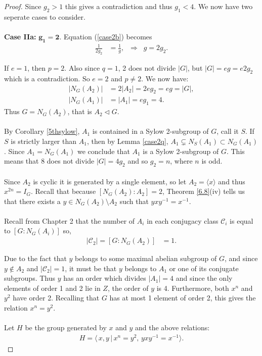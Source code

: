 \documentclass[a4paper , 11pt]{book}
\theoremstyle{definition}
\theoremstyle{remark}
\begin{document}
\begin{proof}
Since $g_2 > 1$  this gives a contradiction and thus $g_1 < 4$. We now have two seperate cases to consider.\\
\\
\textbullet \space \textbf{Case IIa:} $\pmb{g_1 = 2}$. Equation (\ref{case2b}) becomes
\begin{align*} \frac{1}{2g_2} &= \frac{1}{g}, \; \; \Longrightarrow \; \; g = 2g_2.
\end{align*}

If $e=1$, then $p=2$. Also since $q=1$, 2 does not divide $|G|$, but $|G| = eg = e2g_2$ which is a contradiction. So $e=2$ and $p \neq 2$. We now have:
\begin{align*} |N_G(A_2)| &= 2|A_2|  = 2eg_2 = eg = |G|,  \tag{since $s+t = 2$}
\\ |N_G(A_1)| &= |A_1| = eg_1 = 4. \tag{since $s=1$} 
\end{align*}
Thus $G = N_G(A_2)$, that is $A_2 \vartriangleleft G$.\\
\\
By Corollary \ref{5thsylow}, $A_1$ is contained in a Sylow 2-subgroup of $G$, call it $S$. If $S$ is strictly larger than $A_1$, then by Lemma \ref{case2q}, $A_1 \subsetneq N_S(A_1) \subset N_G(A_1)$. Since $A_1 = N_G(A_1)$ we conclude that $A_1$ is a Sylow 2-subgroup of $G$. This means that 8 does not divide $|G| = 4g_2$ and so $g_2 = n$, where $n$ is odd. \\
\\
Since $A_2$ is cyclic it is generated by a single element, so let $A_2 = \langle x \rangle$ and thus $x^{2n}= I_G$.  Recall that because $[N_G(A_2): A_2] = 2$, Theorem \ref{6.8}(iv) tells us that there exists a $y \in N_G(A_2) \! \setminus \! A_2$ such that $yxy^{-1} = x^{-1}$. \\
\\
Recall from Chapter 2 that the number of $A_i$ in each conjugacy class $\mathcal{C}_i$ is equal to $[G : N_G(A_i)]$ so,
\begin{align*}  |\mathcal{C}_2| = [G:N_G(A_2)] &= 1.
\end{align*}

Due to the fact that $y$ belongs to some maximal abelian subgroup of $G$, and since $y \not \in A_2$ and $|\mathcal{C}_2| = 1$, it must be that $y$ belongs to $A_1$ or one of its conjugate subgroups. Thus $y$ has an order which divides $|A_1| = 4$ and since the only elements of order 1 and 2 lie in $Z$, the order of $y$ is 4. Furthermore, both $x^n$ and $y^2$ have order 2. Recalling that $G$ has at most 1 element of order 2, this gives the relation $x^n = y^2$. \\ 
\\
Let $H$ be the group generated by $x$ and $y$ and the above relations:
\begin{align*} H = \langle \, x,y \, | \, x^n = y^2, \, yxy^{-1} = x^{-1} \rangle.
\end{align*}


\end{proof}
\end{document}

